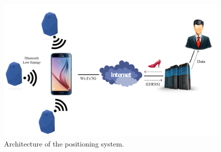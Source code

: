 \begin{figure}[!htb]
	\centering
	\includegraphics[width=1\textwidth]{Figures/architecture.png}
	\caption[Architecture of the positioning system]{Architecture of the positioning system.}
	\label{fig:motiv}
\end{figure} 

